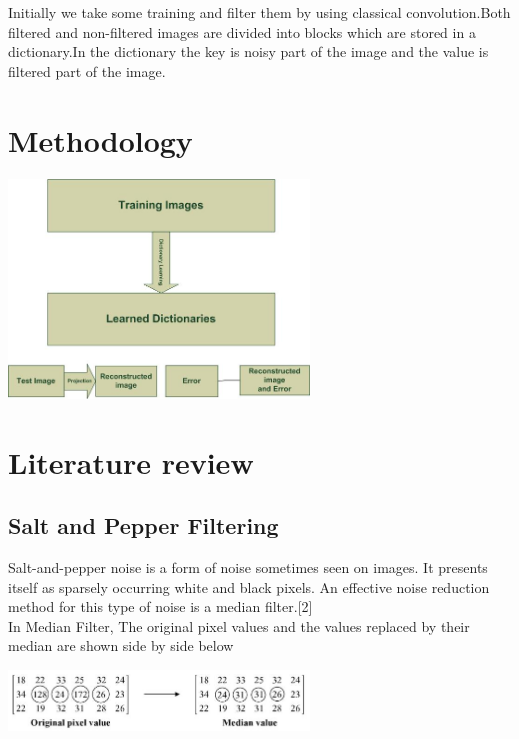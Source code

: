 \documentclass[journal]{IEEEtran}
\begin{document}
	Initially we take some training and filter them by using classical convolution.Both filtered and non-filtered images are divided into blocks which are stored in a dictionary.In the dictionary the key is noisy part of the image and the value is filtered part of the image.
	
	\section{\textbf{Methodology}}
	\begin{minipage}{\linewidth}
		\centering
		\includegraphics[width = 80mm]{2.jpg}
	\end{minipage} 
	\section{\textbf{Literature review}}
	\subsection{\textbf{Salt and Pepper Filtering}}
	Salt-and-pepper noise is a form of noise sometimes seen on images. It presents itself as sparsely occurring white and black pixels. An effective noise reduction method for this type of noise is a median filter.[2]\\
	  In Median Filter,
	 The original pixel values and the values replaced by their median are shown side by side below\\
	\begin{minipage}{\linewidth}
		\centering
		\includegraphics[width = 80mm]{1.jpg}
	\end{minipage} 
		
\end{document}
